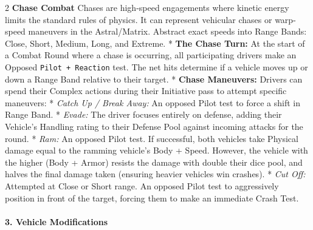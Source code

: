 \documentclass[
  oneside]{article}
\begin{document}
\begin{multicols}{2}
\textbf{Chase Combat} Chases are high-speed
engagements where kinetic energy limits the
standard rules of physics. It can represent
vehicular chases or warp-speed maneuvers in the
Astral/Matrix. Abstract exact speeds into Range
Bands: Close, Short, Medium, Long, and Extreme. *
\textbf{The Chase Turn:} At the start of a Combat
Round where a chase is occurring, all
participating drivers make an Opposed
\texttt{Pilot\ +\ Reaction} test. The net hits
determine if a vehicle moves up or down a Range
Band relative to their target. * \textbf{Chase
Maneuvers:} Drivers can spend their Complex
actions during their Initiative pass to attempt
specific maneuvers: * \emph{Catch Up / Break
Away:} An opposed Pilot test to force a shift in
Range Band. * \emph{Evade:} The driver focuses
entirely on defense, adding their Vehicle's
Handling rating to their Defense Pool against
incoming attacks for the round. * \emph{Ram:} An
opposed Pilot test. If successful, both vehicles
take Physical damage equal to the ramming
vehicle's Body + Speed. However, the vehicle with
the higher (Body + Armor) resists the damage with
double their dice pool, and halves the final
damage taken (ensuring heavier vehicles win
crashes). * \emph{Cut Off:} Attempted at Close or
Short range. An opposed Pilot test to aggressively
position in front of the target, forcing them to
make an immediate Crash Test.

\hypertarget{vehicle-modifications}{%
\paragraph{3. Vehicle
Modifications}\label{vehicle-modifications}}

\end{multicols}
\end{document}
